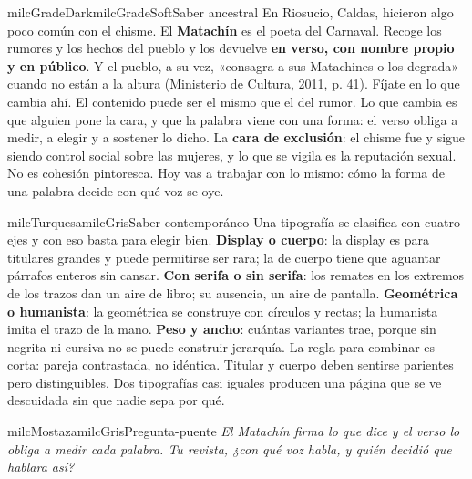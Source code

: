 \documentclass[11pt,letterpaper]{article}
\begin{document}
\begin{softbox}{milcGradeDark}{milcGradeSoft}{Saber ancestral}
En Riosucio, Caldas, hicieron algo poco común con el chisme. El \textbf{Matachín} es el poeta del Carnaval. Recoge los rumores y los hechos del pueblo y los devuelve \textbf{en verso, con nombre propio y en público}. Y el pueblo, a su vez, «consagra a sus Matachines o los degrada» cuando no están a la altura (Ministerio de Cultura, 2011, p. 41). Fíjate en lo que cambia ahí. El contenido puede ser el mismo que el del rumor. Lo que cambia es que alguien pone la cara, y que la palabra viene con una forma: el verso obliga a medir, a elegir y a sostener lo dicho. La \textbf{cara de exclusión}: el chisme fue y sigue siendo control social sobre las mujeres, y lo que se vigila es la reputación sexual. No es cohesión pintoresca. Hoy vas a trabajar con lo mismo: cómo la forma de una palabra decide con qué voz se oye.\par{}
\end{softbox}

\begin{softbox}{milcTurquesa}{milcGris}{Saber contemporáneo}
Una tipografía se clasifica con cuatro ejes y con eso basta para elegir bien. \textbf{Display o cuerpo}: la display es para titulares grandes y puede permitirse ser rara; la de cuerpo tiene que aguantar párrafos enteros sin cansar. \textbf{Con serifa o sin serifa}: los remates en los extremos de los trazos dan un aire de libro; su ausencia, un aire de pantalla. \textbf{Geométrica o humanista}: la geométrica se construye con círculos y rectas; la humanista imita el trazo de la mano. \textbf{Peso y ancho}: cuántas variantes trae, porque sin negrita ni cursiva no se puede construir jerarquía. La regla para combinar es corta: pareja contrastada, no idéntica. Titular y cuerpo deben sentirse parientes pero distinguibles. Dos tipografías casi iguales producen una página que se ve descuidada sin que nadie sepa por qué.
\end{softbox}

\begin{softbox}{milcMostaza}{milcGris}{Pregunta-puente}
\textit{El Matachín firma lo que dice y el verso lo obliga a medir cada palabra. Tu revista, ¿con qué voz habla, y quién decidió que hablara así?}
\end{softbox}
\end{document}
